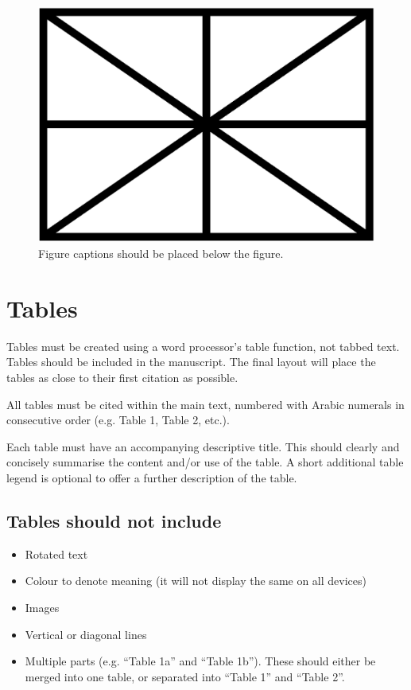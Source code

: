 \documentclass{article}
\begin{document}
\begin{figure}[htbp]
  \centering
  \includegraphics[width=0.9\columnwidth]{figure}
  \caption{Figure captions should be placed below the figure.}
\label{fig:figure}
\end{figure}

\section{Tables}\label{sec:tables}

Tables must be created using a word processor's table function,
not tabbed text.
Tables should be included in the manuscript.
The final layout will place the tables as close to their first
citation as possible.

All tables must be cited within the main text, numbered with Arabic
numerals in consecutive order (e.g. Table 1, Table 2, etc.).

Each table must have an accompanying descriptive title.
This should clearly and concisely summarise the content and/or
use of the table.
A short additional table legend is optional to offer a further
description of the table.

\subsection{Tables should not include}

\begin{itemize}
  \item Rotated text
  \item Colour to denote meaning (it will not display the same on all devices)
  \item Images
  \item Vertical or diagonal lines
  \item Multiple parts (e.g. ``Table 1a'' and ``Table 1b'').
  These should either be merged into one table,
  or separated into ``Table 1'' and ``Table 2''.
\end{itemize}
\end{document}
